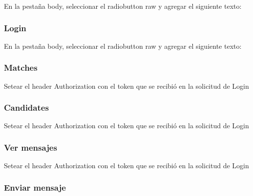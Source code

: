 \documentclass[letterpaper,10pt,english]{sphinxmanual}
\begin{document}
En la pestaña body, seleccionar el radiobutton raw y agregar el siguiente texto:



\subsubsection{Login}
\label{manuals:id4}

En la pestaña body, seleccionar el radiobutton raw y agregar el siguiente texto:



\subsubsection{Matches}
\label{manuals:matches}

Setear el header Authorization con el token que se recibió en la solicitud de Login



\subsubsection{Candidates}
\label{manuals:candidates}

Setear el header Authorization con el token que se recibió en la solicitud de Login



\subsubsection{Ver mensajes}
\label{manuals:ver-mensajes}

Setear el header Authorization con el token que se recibió en la solicitud de Login



\subsubsection{Enviar mensaje}
\label{manuals:enviar-mensaje}
\end{document}
